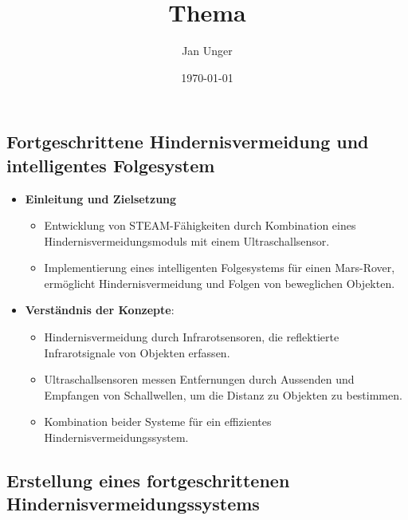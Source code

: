 \documentclass{vorlage-design-main}
\title{Thema}
\author{Jan Unger}
\date{\today}
\begin{document}
\maketitle

\begin{abstract}

\end{abstract}

\hypertarget{fortgeschrittene-hindernisvermeidung-und-intelligentes-folgesystem}{%
\subsection{Fortgeschrittene Hindernisvermeidung und intelligentes
Folgesystem}\label{fortgeschrittene-hindernisvermeidung-und-intelligentes-folgesystem}}

\begin{itemize}

\item
  \textbf{Einleitung und Zielsetzung}

  \begin{itemize}
  
  \item
    Entwicklung von STEAM-Fähigkeiten durch Kombination eines
    Hindernisvermeidungsmoduls mit einem Ultraschallsensor.
  \item
    Implementierung eines intelligenten Folgesystems für einen
    Mars-Rover, ermöglicht Hindernisvermeidung und Folgen von
    beweglichen Objekten.
  \end{itemize}
\item
  \textbf{Verständnis der Konzepte}:

  \begin{itemize}
  
  \item
    Hindernisvermeidung durch Infrarotsensoren, die reflektierte
    Infrarotsignale von Objekten erfassen.
  \item
    Ultraschallsensoren messen Entfernungen durch Aussenden und
    Empfangen von Schallwellen, um die Distanz zu Objekten zu bestimmen.
  \item
    Kombination beider Systeme für ein effizientes
    Hindernisvermeidungssystem.
  \end{itemize}
\end{itemize}

\hypertarget{erstellung-eines-fortgeschrittenen-hindernisvermeidungssystems}{%
\subsection{Erstellung eines fortgeschrittenen
Hindernisvermeidungssystems}\label{erstellung-eines-fortgeschrittenen-hindernisvermeidungssystems}}
\end{document}
